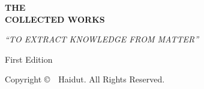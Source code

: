 \begin{fullwidth}

\begin{center}
{\fontsize{14pt}{18pt}\selectfont{}}

\vspace*{8\baselineskip}

{\fontsize{36pt}{40pt}\selectfont\textbf{THE}}\\[12pt]
{\fontsize{36pt}{40pt}\selectfont\textbf{COLLECTED WORKS}}

\vspace*{3\baselineskip}

{\fontsize{14pt}{18pt}\selectfont\textit{\enquote{TO EXTRACT KNOWLEDGE FROM MATTER}}}

\vspace*{4\baselineskip}

{\fontsize{18pt}{22pt}\selectfont\textbf{\covervolume}}

\vspace*{1\baselineskip}

{\fontsize{14pt}{18pt}\selectfont\coveryear}

\vspace*{1\baselineskip}

{\fontsize{12pt}{16pt}\selectfont First Edition}

\vfill

{\footnotesize Copyright \copyright\ \coveryear\ Haidut. All Rights Reserved.}

\end{center}

\end{fullwidth}